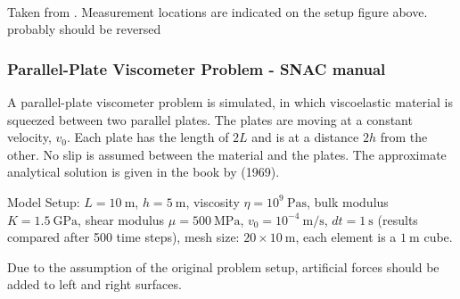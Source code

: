 \begin{center}
\\
{\captionfont Taken from \textcite{kubo77}. Measurement locations are indicated on 
the setup figure above. probably should be reversed}
\end{center}






\subsubsection{Parallel-Plate Viscometer Problem - SNAC manual \label{v-e-snac}}

A parallel-plate viscometer problem is simulated, in which viscoelastic material is squeezed between two
parallel plates. The plates are moving at a constant velocity, $v_0$. Each plate has the length of $2L$ and 
is at a distance $2h$ from the other. No slip is assumed between the material and the plates. The approximate
analytical solution is given in the book by \textcite{jaeg69} (1969).

Model Setup: $L = 10~\si{\meter}$, $h=5~\si{\meter}$, viscosity $\eta=10^9~\si{\pascal\second}$, 
bulk modulus $K= 1.5~\si{\giga\pascal}$, shear modulus $\mu = 500~\si{\mega\pascal}$,
$v_0 = 10^{-4}~\si{\meter\per\second}$, $dt = 1~\si{\second}$ (results compared after 500 time steps),
mesh size: $20\times 10~\si{\meter}$, each element is a $1~\si{\meter}$ cube.

Due to the assumption of the original problem setup, artificial forces should be added to left and right
surfaces.

